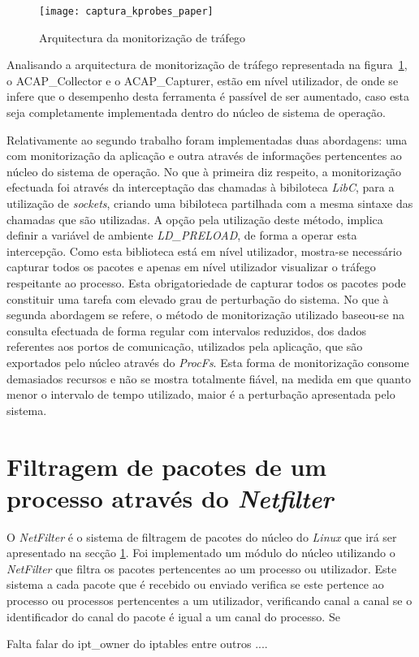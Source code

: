 \begin{figure}[h!]
       \centering
       \texttt{[image: captura\_kprobes\_paper]}
       \caption{Arquitectura da monitorização de tráfego}
	\label{fig:paper_capture_kprobes}
\end{figure}


Analisando a arquitectura de monitorização de tráfego representada na figura~\ref{fig:paper_capture_kprobes}, o ACAP\_Collector e o ACAP\_Capturer, estão em nível utilizador, de onde se infere que o desempenho desta ferramenta é passível de ser aumentado, caso esta seja completamente implementada dentro do núcleo de sistema de operação.

Relativamente ao segundo trabalho foram implementadas duas abordagens: uma com monitorização da aplicação e outra através de informações pertencentes ao núcleo do sistema de operação.
No que à primeira diz respeito, a monitorização efectuada foi através da interceptação das chamadas à bibiloteca \textit{LibC}, para a utilização de \textit{sockets}, criando uma bibiloteca partilhada com a mesma sintaxe das chamadas que são utilizadas.
A opção pela utilização deste método, implica definir a variável de ambiente \textit{LD\_PRELOAD}, de forma a operar esta intercepção.
Como esta biblioteca está em nível utilizador, mostra-se necessário capturar todos os pacotes e apenas em nível utilizador visualizar o tráfego respeitante ao processo.
Esta obrigatoriedade de capturar todos os pacotes pode constituir uma tarefa com elevado grau de perturbação do sistema.
No que à segunda abordagem se refere, o método de monitorização utilizado baseou-se na consulta efectuada de forma regular com intervalos reduzidos, dos dados referentes aos portos de comunicação, utilizados pela aplicação, que são exportados pelo núcleo através do \textit{ProcFs}.
Esta forma de monitorização consome demasiados recursos e não se mostra totalmente fiável, na medida em que quanto menor o intervalo de tempo utilizado, maior é a perturbação apresentada pelo sistema.

\section{Filtragem de pacotes de um processo através do \textit{Netfilter}}

O \textit{NetFilter} é o sistema de filtragem de pacotes do núcleo do \textit{Linux} que irá ser apresentado na secção \ref{}.
Foi implementado um módulo do núcleo utilizando o \textit{NetFilter} que filtra os pacotes pertencentes ao um processo ou utilizador.
Este sistema a cada pacote que é recebido ou enviado verifica se este pertence ao processo ou processos pertencentes a um utilizador, verificando canal a canal se o identificador do canal do pacote é igual a um canal do processo. Se 





Falta falar do ipt\_owner do iptables entre outros ....

